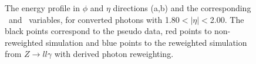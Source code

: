 \begin{figure}[htbp]
	\begin{tcolorbox}[colback=black!5!white,colframe=white!75!black]
    \caption{The energy profile in $\phi$ and $\eta$ directions (a,b) and the corresponding \Rphi \ and \Reta \ variables, for converted photons with 1.80$<|\eta|<$2.00. The black points correspond to the pseudo data, red points to non-reweighted simulation and blue points to the reweighted simulation from $Z\rightarrow ll\gamma$ with derived photon reweighting.}
    \label{Photon:4}
    \end{tcolorbox}
    
\end{figure}

